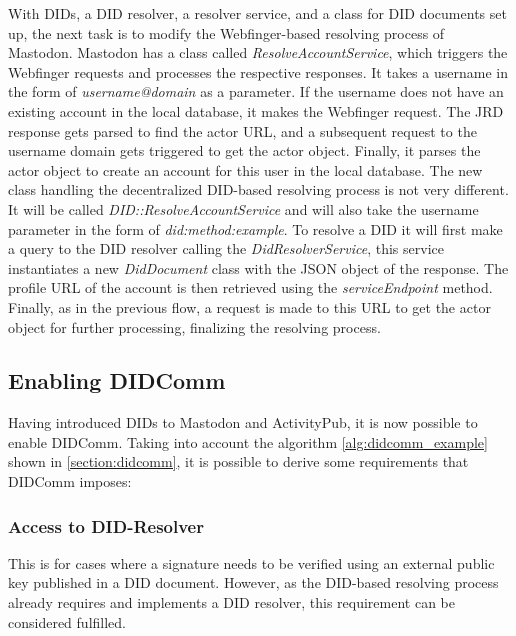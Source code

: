 With DIDs, a DID resolver, a resolver service, and a class for DID documents set up, the next task is to modify the Webfinger-based resolving process of Mastodon. Mastodon has a class called \emph{ResolveAccountService}, which triggers the Webfinger requests and processes the respective responses. It takes a username in the form of \emph{username@domain} as a parameter. If the username does not have an existing account in the local database, it makes the Webfinger request. The JRD response gets parsed to find the actor URL, and a subsequent request to the username domain gets triggered to get the actor object. Finally, it parses the actor object to create an account for this user in the local database.
The new class handling the decentralized DID-based resolving process is not very different. It will be called \emph{DID::ResolveAccountService} and will also take the username parameter in the form of \emph{did:method:example}. To resolve a DID it will first make a query to the DID resolver calling the \emph{DidResolverService}, this service instantiates a new \emph{DidDocument} class with the JSON object of the response. The profile URL of the account is then retrieved using the \emph{serviceEndpoint} method. Finally, as in the previous flow, a request is made to this URL to get the actor object for further processing, finalizing the resolving process. 


\subsection{Enabling DIDComm}\label{section:enabling_didcomm}

Having introduced DIDs to Mastodon and ActivityPub, it is now possible to enable DIDComm. Taking into account the algorithm \ref{alg:didcomm_example} shown in \autoref{section:didcomm}, it is possible to derive some requirements that DIDComm imposes:

\subsubsection*{\textbf{Access to DID-Resolver}}
This is for cases where a signature needs to be verified using an external public key published in a DID document. However, as the DID-based resolving process already requires and implements a DID resolver, this requirement can be considered fulfilled. 

